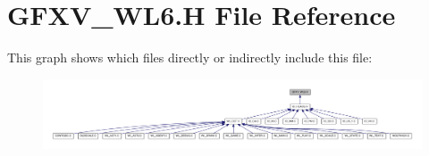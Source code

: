\hypertarget{GFXV__WL6_8H}{
\section{GFXV\_\-WL6.H File Reference}
\label{GFXV__WL6_8H}
}
This graph shows which files directly or indirectly include this file:
\nopagebreak
\begin{figure}[H]
\begin{center}
\leavevmode
\includegraphics[width=400pt]{GFXV__WL6_8H__dep__incl}
\end{center}
\end{figure}
